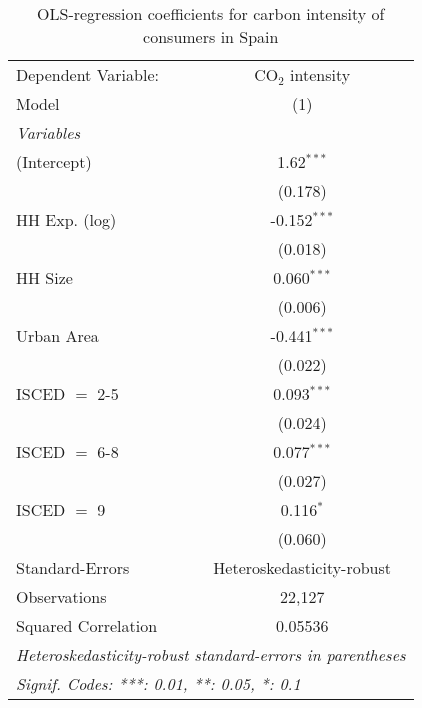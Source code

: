 
\begin{table}[htbp!]
   \centering
   \small
   \begin{adjustbox}{width = 1\textwidth, max height = 0.95\textheight, center}
      \begin{threeparttable}[b]
         \caption{\label{tab:OLS_1_ESP} OLS-regression coefficients for carbon intensity of consumers in Spain}
         \begin{tabular}{lc}
            \tabularnewline \midrule \midrule
            Dependent Variable: & CO$_{2}$ intensity\\  
            Model               & (1)\\  
            \midrule
            \emph{Variables}\\
            (Intercept)         & 1.62$^{***}$\\   
                                & (0.178)\\   
            HH Exp. (log)       & -0.152$^{***}$\\   
                                & (0.018)\\   
            HH Size             & 0.060$^{***}$\\   
                                & (0.006)\\   
            Urban Area          & -0.441$^{***}$\\   
                                & (0.022)\\   
            ISCED $=$ 2-5       & 0.093$^{***}$\\   
                                & (0.024)\\   
            ISCED $=$ 6-8       & 0.077$^{***}$\\   
                                & (0.027)\\   
            ISCED $=$ 9         & 0.116$^{*}$\\   
                                & (0.060)\\   
            \midrule 
            Standard-Errors     & Heteroskedasticity-robust \\   
            Observations        & 22,127\\  
            Squared Correlation & 0.05536\\  
            \midrule \midrule
            \multicolumn{2}{l}{\emph{Heteroskedasticity-robust standard-errors in parentheses}}\\
            \multicolumn{2}{l}{\emph{Signif. Codes: ***: 0.01, **: 0.05, *: 0.1}}\\
         \end{tabular}
         

\end{threeparttable}
\end{adjustbox}
\end{table}
